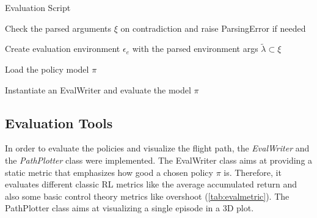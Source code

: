 \begin{algorithm}
	\caption{Evaluation Script}
	\label{alg:eval}
	Check the parsed arguments $\xi$ on contradiction and raise ParsingError if needed
	
	Create evaluation environment $\epsilon_e$ with the parsed environment args $\tilde{\lambda} \subset \xi$
	
	Load the policy model $\pi$
	
	Instantiate an EvalWriter and evaluate the model $\pi$
	


\end{algorithm}

\newpage

\newpage

\subsection{Evaluation Tools} \label{sec:tools}
In order to evaluate the policies and visualize the flight path, the \emph{EvalWriter} and the \emph{PathPlotter} class were implemented.
The EvalWriter class aims at providing a static metric that emphasizes how good a chosen policy $\pi$ is. 
Therefore, it evaluates different classic RL metrics like the average accumulated return and also some basic control theory metrics like overshoot (\cref{tab:evalmetric}).
The PathPlotter class aims at visualizing a single episode in a 3D plot.


